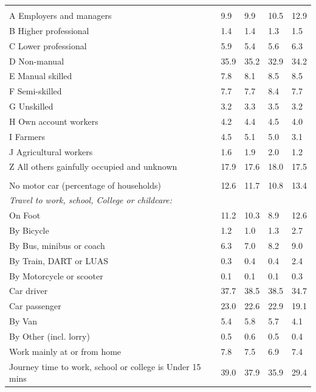 \documentclass{article}
\begin{document}
\begin{table}[h]
\begin{tabular}{KTTTT}
\hline
    \\ 
    \hline
A Employers and managers &  9.9&  9.9& 10.5& 12.9\\
B Higher professional & 1.4& 1.4& 1.3& 1.5\\
C Lower professional & 5.9& 5.4& 5.6& 6.3\\
D Non-manual & 35.9& 35.2& 32.9& 34.2\\
E Manual skilled & 7.8& 8.1& 8.5& 8.5\\
F Semi-skilled & 7.7& 7.7& 8.4& 7.7\\
G Unskilled & 3.2& 3.3& 3.5& 3.2\\
H Own account workers & 4.2& 4.4& 4.5& 4.0\\
I Farmers & 4.5& 5.1& 5.0& 3.1\\
J Agricultural workers & 1.6& 1.9& 2.0& 1.2\\
Z All others gainfully occupied and unknown & 17.9& 17.6& 18.0& 17.5\\
\hline
{}\hline
    \\ 
    \hline
No motor car (percentage of households) & 12.6& 11.7& 10.8& 
13.4\\
    \hline 
\emph{Travel to work, school, College or childcare:} & & & \\
\quad On Foot & 11.2& 10.3&  8.9& 12.6\\ 
\quad By Bicycle & 1.2& 1.0& 1.3& 2.7\\ 
\quad By Bus, minibus or coach & 6.3& 7.0& 8.2& 9.0\\
\quad By Train, DART or LUAS & 0.3& 0.4& 0.4& 2.4\\
\quad By Motorcycle or scooter & 0.1& 0.1& 0.1& 0.3\\
\quad Car driver & 37.7 & 38.5& 38.5& 34.7\\
\quad Car passenger & 23.0& 22.6& 22.9& 19.1\\
\quad By Van & 5.4& 5.8& 5.7& 4.1\\
\quad By Other (incl. lorry) & 0.5& 0.6& 0.5& 0.4\\
    \hline
Work mainly at or from home & 7.8& 7.5& 6.9& 7.4\\
Journey time to work, school or college is Under 15 mins & 39.0& 37.9& 35.9& 29.4\\

\end{tabular}
\end{table}
\end{document}
